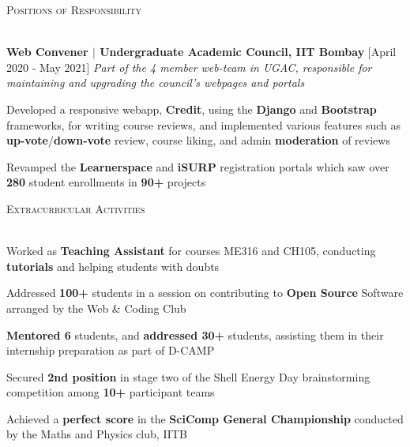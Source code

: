 \documentclass[10pt]{article}
\renewcommand{\section}[1]{
    \vspace*{5pt}
    \textsc{\Large{#1}}
    \vspace*{-8pt} \\ \hspace*{-5pt} 
    \hrulefill \\
    \vspace*{-15pt}
    \vspace*{-5pt}
}
\newcommand{\smallbullet}{
    \small$\bullet$
}
\newenvironment{bullet-list-major}{
    \vspace*{8pt}
    \begin{list}{
        \smallbullet
    }{
        \setlength\leftmargin{15pt}\topsep -5pt \itemsep -6pt
    }
} {
    \end{list}
}
\newcommand{\bigblock}[3]{
    {
        \vspace*{3pt}
        \hspace*{-7pt} {\large{\textbf{#1}}} \hfill #2 \newline
        \textit{\textsf{#3}}
    }
}
\newenvironment{bullet-list-minor}{
    \begin{list}{
        \smallbullet
    }{
        \setlength\leftmargin{15pt}\topsep -6pt \itemsep -5pt
    }
} {
    \end{list}
}
\begin{document}

    \section{Positions of Responsibility}

    \bigblock{
        Web Convener \(|\) Undergraduate Academic Council, IIT Bombay
    }{
        [April 2020 - May 2021]
    }{
        Part of the 4 member web-team in UGAC, responsible for maintaining and upgrading the council's webpages and portals
    }
    \begin{bullet-list-minor}
        \item Developed a responsive webapp, \textbf{Credit}, using the \textbf{Django} and \textbf{Bootstrap} frameworks, for writing course reviews, and implemented various features such as \textbf{up-vote}/\textbf{down-vote} review, course liking, and admin \textbf{moderation} of reviews
        \item Revamped the \textbf{Learnerspace} and \textbf{iSURP} registration portals which saw over \textbf{280} student enrollments in \textbf{90+} projects
    \end{bullet-list-minor}


    \section{Extracurricular Activities}

    \begin{bullet-list-major}
        \item Worked as \textbf{Teaching Assistant} for courses ME316 and CH105, conducting \textbf{tutorials} and helping students with doubts
        \item Addressed \textbf{100+} students in a session on contributing to \textbf{Open Source} Software arranged by the Web \& Coding Club
        \item \textbf{Mentored 6} students, and \textbf{addressed 30+} students, assisting them in their internship preparation as part of D-CAMP
        \item Secured \textbf{2nd position} in stage two of the Shell Energy Day brainstorming competition among \textbf{10+} participant teams
        \item Achieved a \textbf{perfect score} in the \textbf{SciComp General Championship} conducted by the Maths and Physics club, IITB
    \end{bullet-list-major}


    \vspace*{-7.71mm}
\end{document}
